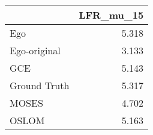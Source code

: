 \begin{tabular}{lr}
\toprule
{} & LFR_mu_15 \\
\midrule
Ego          &     5.318 \\
Ego-original &     3.133 \\
GCE          &     5.143 \\
Ground Truth &     5.317 \\
MOSES        &     4.702 \\
OSLOM        &     5.163 \\
\bottomrule
\end{tabular}

